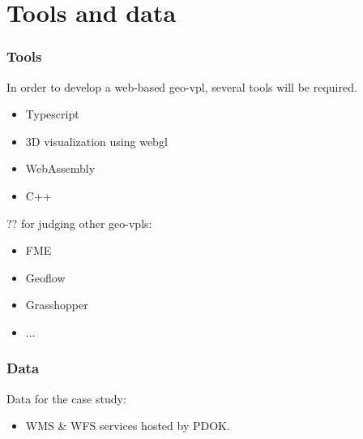 \newpage
\section{Tools and data}

\subsubsection{Tools}

In order to develop a web-based geo-vpl, several tools will be required. 

\begin{itemize}
  \item Typescript
  \item 3D visualization using webgl 
  \item WebAssembly
  \item C++ 
\end{itemize}


?? for judging other geo-vpls: 
\begin{itemize}
  \item FME
  \item Geoflow
  \item Grasshopper
  \item ...
\end{itemize}


\subsubsection{Data}

Data for the case study:
\begin{itemize}
  \item WMS \& WFS services hosted by PDOK.
\end{itemize}
